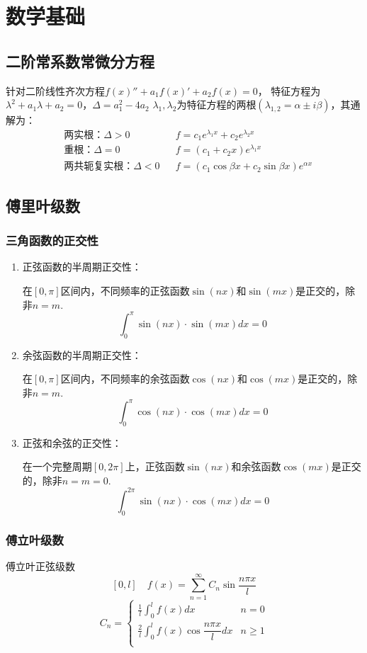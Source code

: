 \newpage
\section{数学基础}
\subsection{二阶常系数常微分方程}
针对二阶线性齐次方程$f(x)''+a_1f(x)'+a_2f(x)=0$，
特征方程为$\lambda^2+a_1\lambda+a_2=0$，$\Delta=a_1^2-4a_2$
$\lambda_1,\lambda_2$为特征方程的两根$(\lambda_{1,2}=\alpha\pm i\beta)$，其通解为：
$$\begin{aligned}
    &\mbox{两实根：}\Delta>0        &&f=c_1e^{\lambda_1x}+c_2e^{\lambda_2x}\\
    &\mbox{重根：}\Delta=0          &&f=(c_1+c_2x)e^{\lambda_1x}\\
    &\mbox{两共轭复实根：}\Delta<0    &&f=(c_1\cos{\beta x}+c_2\sin{\beta x})e^{\alpha x}
\end{aligned}$$

\subsection{傅里叶级数}
\subsubsection{三角函数的正交性}
\begin{enumerate}
    \item 正弦函数的半周期正交性：
    
    在$[0,\pi]$区间内，不同频率的正弦函数$\sin⁡(nx)$和$\sin⁡(mx)$是正交的，除非$n=m$.
        $$\int_0^\pi\sin⁡(nx)\cdot\sin⁡(mx) dx=0$$
    \item 余弦函数的半周期正交性：
    
    在$[0,\pi]$区间内，不同频率的余弦函数$\cos⁡(nx)$和$\cos⁡(mx)$是正交的，除非$n=m$.
        $$\int_0^\pi\cos(nx)\cdot\cos(mx) dx=0$$
    \item 正弦和余弦的正交性：
      
    在一个完整周期$[0,2\pi]$上，正弦函数$\sin⁡(nx)$和余弦函数$\cos⁡(mx)$是正交的，除非$n=m=0$.
      $$\int_0^{2\pi}\sin(nx)\cdot\cos(mx) dx=0$$
\end{enumerate}

\subsubsection{傅立叶级数}

傅立叶正弦级数
$$[0,l]\quad f(x)=\sum_{n=1}^\infty C_n\sin{\frac{n\pi x}{l}}$$
$$C_n=\left\{
\begin{array}{lc}
\frac{1}{l}\int_0^lf(x)dx &n=0\\
\frac{2}{l}\int_0^lf(x)\cos\dfrac{n\pi x}{l}dx &n\ge1\\
\end{array}
\right.$$

